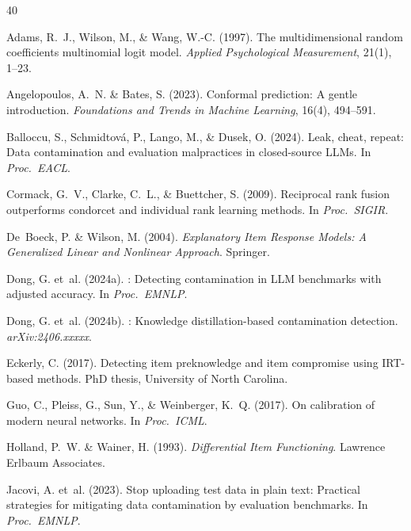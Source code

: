 \documentclass[11pt,a4paper]{article}
\begin{document}
\begin{thebibliography}{40}

Adams, R.~J., Wilson, M., \& Wang, W.-C. (1997).
\newblock The multidimensional random coefficients multinomial logit model.
\newblock \emph{Applied Psychological Measurement}, 21(1), 1--23.

Angelopoulos, A.~N. \& Bates, S. (2023).
\newblock Conformal prediction: A gentle introduction.
\newblock \emph{Foundations and Trends in Machine Learning}, 16(4), 494--591.

Balloccu, S., Schmidtov{\'a}, P., Lango, M., \& Dusek, O. (2024).
\newblock Leak, cheat, repeat: Data contamination and evaluation malpractices in closed-source {LLMs}.
\newblock In \emph{Proc.\ EACL}.

Cormack, G.~V., Clarke, C.~L., \& Buettcher, S. (2009).
\newblock Reciprocal rank fusion outperforms condorcet and individual rank learning methods.
\newblock In \emph{Proc.\ SIGIR}.

De~Boeck, P. \& Wilson, M. (2004).
\newblock \emph{Explanatory Item Response Models: A Generalized Linear and Nonlinear Approach}.
\newblock Springer.

Dong, G. et~al. (2024a).
: Detecting contamination in {LLM} benchmarks with adjusted accuracy.
\newblock In \emph{Proc.\ EMNLP}.

Dong, G. et~al. (2024b).
: Knowledge distillation-based contamination detection.
\newblock \emph{arXiv:2406.xxxxx}.

Eckerly, C. (2017).
\newblock Detecting item preknowledge and item compromise using {IRT}-based methods.
\newblock PhD thesis, University of North Carolina.

Guo, C., Pleiss, G., Sun, Y., \& Weinberger, K.~Q. (2017).
\newblock On calibration of modern neural networks.
\newblock In \emph{Proc.\ ICML}.

Holland, P.~W. \& Wainer, H. (1993).
\newblock \emph{Differential Item Functioning}.
\newblock Lawrence Erlbaum Associates.

Jacovi, A. et~al. (2023).
\newblock Stop uploading test data in plain text: Practical strategies for mitigating data contamination by evaluation benchmarks.
\newblock In \emph{Proc.\ EMNLP}.


\end{thebibliography}
\end{document}
